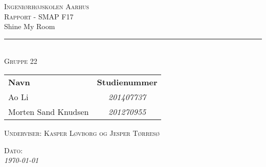\thispagestyle{empty}
\newcommand{\HRule}{\rule{\linewidth}{0.1mm}} %

\begin{center}
	\vspace{3cm}
	\textsc{\LARGE Ingeniørhøjskolen Aarhus}\\[1.5cm] %
	
	\textsc{\large Rapport - SMAP F17}\\[2.5cm] 
	

	{\LARGE Shine My Room} \\[0.5cm]
	
	\HRule \\[0.8cm]
	
	
	\textsc{\large Gruppe 22}\\
	\vspace{0.5 in}
	\begin{center}
		\begin{tabular}{l c}
			\textbf{Navn} & \textbf{Studienummer} \\
			Ao Li & \textsl{201407737}    \\
			Morten Sand Knudsen & \textsl{201270955}  \\
			
		\end{tabular}
	\end{center}
	\vspace{0.5 in}
	
	\textsc{\large Underviser: Kasper Løvborg og Jesper Tørresø}
	\vspace{0.5 in}
	
	\textsc{\large Dato: }\\
	{\large\textit{\today}} \\[3cm]
	\vfill %
	
\end{center} %

\clearpage

\newpage